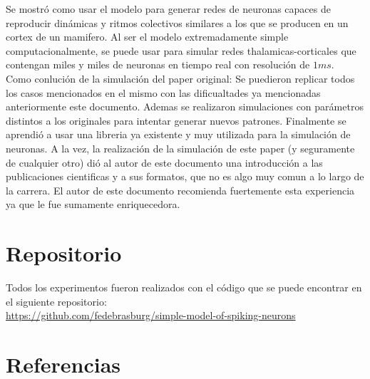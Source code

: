 \documentclass[12pt]{article}
\begin{document}
Se mostró como usar el modelo para generar redes de neuronas capaces de reproducir dinámicas y ritmos colectivos similares a los que se producen en un cortex de un mamifero.
Al ser el modelo extremadamente simple computacionalmente, se puede usar para simular redes thalamicas-corticales que contengan miles y miles de neuronas en tiempo real con resolución de $1 ms$. \\

Como conlución de la simulación del paper original: Se puedieron replicar todos los casos mencionados en el mismo con las dificualtades ya mencionadas anteriormente este documento.
Ademas se realizaron simulaciones con parámetros distintos a los originales para intentar generar nuevos patrones.
Finalmente se aprendió a usar una libreria ya existente y muy utilizada para la simulación de neuronas.
A la vez, la realización de la simulación de este paper (y seguramente de cualquier otro) dió al autor de este documento una introducción a las publicaciones cientificas y a sus formatos, que no es algo muy comun
a lo largo de la carrera.
El autor de este documento recomienda fuertemente esta experiencia ya que le fue sumamente enriquecedora.

\section{Repositorio}
Todos los experimentos fueron realizados con el código que se puede encontrar en el siguiente repositorio: \\
\url{https://github.com/fedebrasburg/simple-model-of-spiking-neurons}

\newpage

\section{Referencias}
\end{document}
